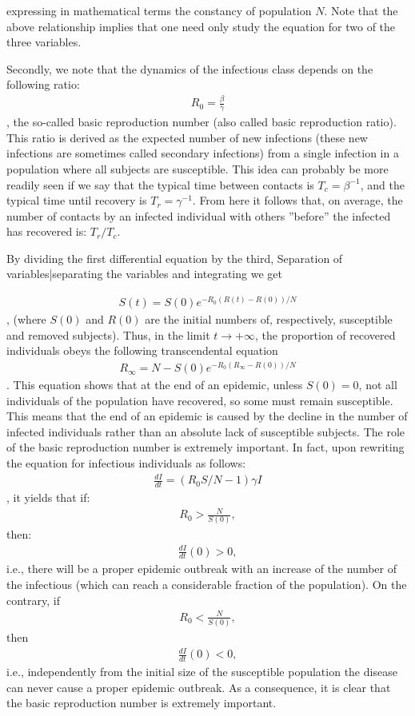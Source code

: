 \documentclass{article}
\begin{document}
expressing in mathematical terms the constancy of population $ N $. Note that
the above relationship implies that one need only study the equation for two of
the three variables.

Secondly, we note that the dynamics of the infectious class depends on the following ratio:
\begin{align}R_0 = \frac{\beta}{\gamma} \end{align},
the so-called basic reproduction number (also called basic reproduction ratio).
This ratio is derived as the expected number of new infections (these new
infections are sometimes called secondary infections) from a single infection
in a population where all subjects are susceptible. This idea can probably be
more readily seen if we say that the typical time between contacts is $ T_{c} =
\beta^{-1}$, and the typical time until recovery is $ T_{r} = \gamma^{-1}$.
From here it follows that, on average, the number of contacts by an infected
individual with others ''before'' the infected has recovered is: $ T_{r}/T_{c}.
$

By dividing the first differential equation by the third, Separation of variables|separating the variables and integrating we get

\begin{align}S(t) = S(0) e^{-R_0(R(t) - R(0))/N} \end{align},
(where $S(0)$ and $R(0)$ are the initial numbers of, respectively, susceptible and removed subjects). Thus, in the limit $t \rightarrow +\infty$, the proportion of recovered individuals obeys the following transcendental equation
\begin{align}R_{\infty} = N - S(0)e^{-R_0(R_{\infty} - R(0))/N} \end{align}.
This equation shows that at the end of an epidemic, unless $S(0)=0$, not all individuals of the population have recovered, so some must remain susceptible. This means that the end of an epidemic is caused by the decline in the number of infected individuals rather than an absolute lack of susceptible subjects.
The role of the basic reproduction number is extremely important. In fact, upon rewriting the equation for infectious individuals as follows:
\begin{align}\frac{dI}{dt} = (R_0 S/N  - 1) \gamma I \end{align},
it yields that if:
\begin{align}R_{0} > \frac{N}{S(0)} ,\end{align}
then:
\begin{align}\frac{dI}{dt}(0) >0 ,\end{align}
i.e., there will be a proper epidemic outbreak with an increase of the number of the  infectious (which can reach a considerable fraction of the population). On the contrary, if
\begin{align}R_{0} < \frac{N}{S(0)} ,\end{align}
then
\begin{align}\frac{dI}{dt}(0) <0 ,\end{align}
i.e., independently from the initial size of the susceptible population the disease can never cause a proper epidemic outbreak. As a consequence, it is clear that the basic reproduction number  is extremely important.
\end{document}
